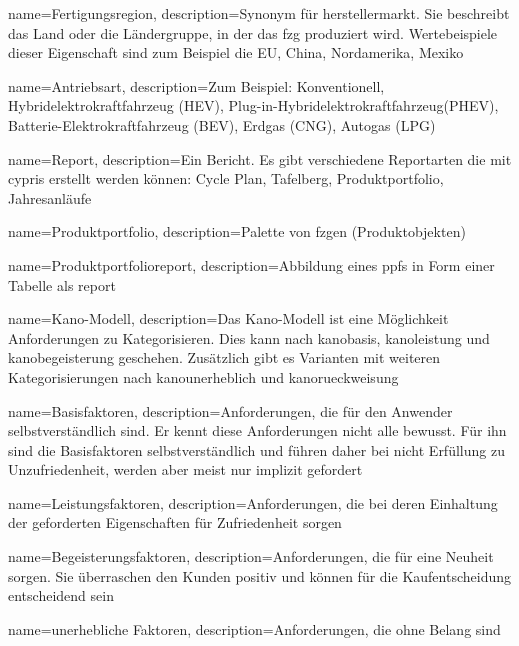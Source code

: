  {
	name=Fertigungsregion,
	description={Synonym f\"ur \gls{herstellermarkt}. Sie beschreibt das Land oder die L\"andergruppe, in der das \gls{fzg} produziert wird. Wertebeispiele dieser Eigenschaft sind zum Beispiel die EU, China, Nordamerika, Mexiko}}
	
 {
	name=Antriebsart,
	description={Zum Beispiel: Konventionell, Hybridelektrokraftfahrzeug (HEV), Plug-in-Hybridelektrokraftfahrzeug(PHEV), Batterie-Elektrokraftfahrzeug (BEV), Erdgas (CNG), Autogas (LPG)}}
	
 {
	name=Report,
	description={Ein Bericht. Es gibt verschiedene Reportarten die mit \gls{cypris} erstellt werden k\"onnen: Cycle Plan, Tafelberg, Produktportfolio, Jahresanl\"aufe}}
	
 {
	name=Produktportfolio,
	description={Palette von \gls{fzg}en (Produktobjekten)}}

 {
	name=Produktportfolioreport,
	description={Abbildung eines \gls{ppf}s in Form einer Tabelle als \gls{report}}}

 {
	name=Kano-Modell,
	description={Das Kano-Modell ist eine M\"oglichkeit Anforderungen zu Kategorisieren. Dies kann nach \gls{kanobasis}, \gls{kanoleistung} und \gls{kanobegeisterung} geschehen. Zus\"atzlich gibt es Varianten mit weiteren Kategorisierungen nach \gls{kanounerheblich} und \gls{kanorueckweisung}}}

 {
	name=Basisfaktoren,
	description={Anforderungen, die f\"ur den Anwender selbstverst\"andlich sind. Er kennt diese Anforderungen nicht alle bewusst. F\"ur ihn sind die Basisfaktoren selbstverst\"andlich und f\"uhren daher bei nicht Erf\"ullung zu Unzufriedenheit, werden aber meist nur implizit gefordert}}
	
 {
	name=Leistungsfaktoren,
	description={Anforderungen, die bei deren Einhaltung der geforderten Eigenschaften f\"ur Zufriedenheit sorgen}}
	
 {
	name=Begeisterungsfaktoren,
	description={Anforderungen, die f\"ur eine Neuheit sorgen. Sie \"uberraschen den Kunden positiv und k\"onnen f\"ur die Kaufentscheidung entscheidend sein}}
	
 {
	name=unerhebliche Faktoren,
	description={Anforderungen, die ohne Belang sind}}
	
